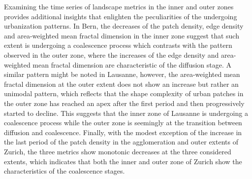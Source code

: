Examining the time series of landscape metrics in the inner and outer zones provides additional insights that enlighten the peculiarities of the undergoing urbanization patterns.
In Bern, the decreases of the patch density, edge density and area-weighted mean fractal dimension in the inner zone suggest that such extent is undergoing a coalescence process which contrasts with the pattern observed in the outer zone, where the increases of the edge density and area-weighted mean fractal dimension are characteristic of the diffusion stage.
A similar pattern might be noted in Lausanne, however, the area-weighted mean fractal dimension at the outer extent does not show an increase but rather an unimodal pattern, which reflects that the shape complexity of urban patches in the outer zone has reached an apex after the first period and then progressively started to decline. This suggests that the inner zone of Lausanne is undergoing a coalescence process while the outer zone is seemingly at the transition between diffusion and coalescence.
Finally, with the modest exception of the increase in the last period of the patch density in the agglomeration and outer extents of Zurich, the three metrics show monotonic decreases at the three considered extents, which indicates that both the inner and outer zone of Zurich show the characteristics of the coalescence stages.



